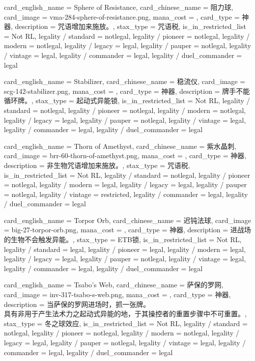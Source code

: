 \documentclass[lang = cn, color = black, 10pt]{AllThatStax}
\begin{document}
\card
{
	card_english_name = {Sphere of Resistance},
	card_chinese_name = {阻力球},
	card_image = vma-284-sphere-of-resistance.png,
	mana_cost = ,
	card_type = 神器,
	description = {咒语增加来施放。},
	stax_type = 咒语税,
	is_in_restricted_list = Not RL,
	legality / standard = notlegal,
	legality / pioneer = notlegal,
	legality / modern = notlegal,
	legality / legacy = legal,
	legality / pauper = notlegal,
	legality / vintage = legal,
	legality / commander = legal,
	legality / duel_commander = legal
}

\card
{
	card_english_name = {Stabilizer},
	card_chinese_name = {稳流仪},
	card_image = scg-142-stabilizer.png,
	mana_cost = ,
	card_type = 神器,
	description = {牌手不能循环牌。},
	stax_type = 起动式异能锁,
	is_in_restricted_list = Not RL,
	legality / standard = notlegal,
	legality / pioneer = notlegal,
	legality / modern = notlegal,
	legality / legacy = legal,
	legality / pauper = notlegal,
	legality / vintage = legal,
	legality / commander = legal,
	legality / duel_commander = legal
}

\card
{
	card_english_name = {Thorn of Amethyst},
	card_chinese_name = {紫水晶刺},
	card_image = brr-60-thorn-of-amethyst.png,
	mana_cost = ,
	card_type = 神器,
	description = {非生物咒语增加来施放。},
	stax_type = 咒语税,
	is_in_restricted_list = Not RL,
	legality / standard = notlegal,
	legality / pioneer = notlegal,
	legality / modern = legal,
	legality / legacy = legal,
	legality / pauper = notlegal,
	legality / vintage = restricted,
	legality / commander = legal,
	legality / duel_commander = legal
}

\card
{
	card_english_name = {Torpor Orb},
	card_chinese_name = {迟钝法球},
	card_image = big-27-torpor-orb.png,
	mana_cost = ,
	card_type = 神器,
	description = {进战场的生物不会触发异能。},
	stax_type = ETB锁,
	is_in_restricted_list = Not RL,
	legality / standard = legal,
	legality / pioneer = legal,
	legality / modern = legal,
	legality / legacy = legal,
	legality / pauper = notlegal,
	legality / vintage = legal,
	legality / commander = legal,
	legality / duel_commander = legal
}

\card
{
	card_english_name = {Tsabo's Web},
	card_chinese_name = {萨保的罗网},
	card_image = inv-317-tsabo-s-web.png,
	mana_cost = ,
	card_type = 神器,
	description = {当萨保的罗网进场时，抓一张牌。\\
具有非用于产生法术力之起动式异能的地，于其操控者的重置步骤中不可重置。},
	stax_type = 冬之球效应,
	is_in_restricted_list = Not RL,
	legality / standard = notlegal,
	legality / pioneer = notlegal,
	legality / modern = notlegal,
	legality / legacy = legal,
	legality / pauper = notlegal,
	legality / vintage = legal,
	legality / commander = legal,
	legality / duel_commander = legal
}
\end{document}
